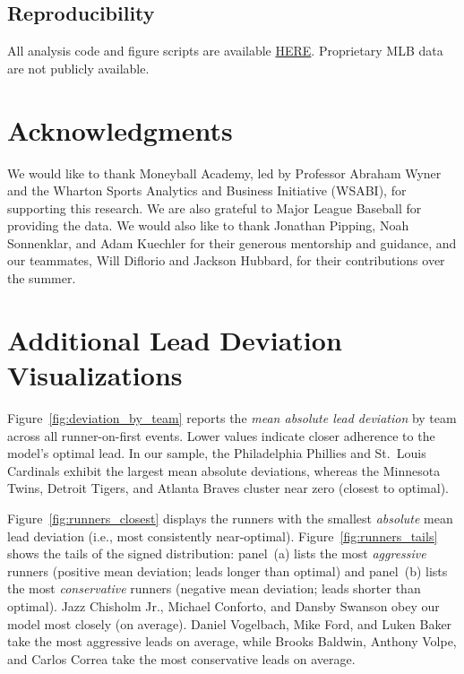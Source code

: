 \documentclass[12pt,letterpaper]{article}
\begin{document}
\subsection{Reproducibility}

All analysis code and figure scripts are available \href{https://github.com/wharton-moneyball/stolen-base-leads}{HERE}. Proprietary MLB data are not publicly available.

\section{Acknowledgments}

We would like to thank Moneyball Academy, led by Professor Abraham Wyner and the Wharton Sports Analytics and Business Initiative (WSABI), for supporting this research. We are also grateful to Major League Baseball for providing the data. We would also like to thank Jonathan Pipping, Noah Sonnenklar, and Adam Kuechler for their generous mentorship and guidance, and our teammates, Will Diflorio and Jackson Hubbard, for their contributions over the summer.




\appendix

\section{Additional Lead Deviation Visualizations} \label{app:a}

Figure~\ref{fig:deviation_by_team} reports the \emph{mean absolute lead deviation} by team across all runner-on-first events. Lower values indicate closer adherence to the model’s optimal lead. In our sample, the Philadelphia Phillies and St.~Louis Cardinals exhibit the largest mean absolute deviations, whereas the Minnesota Twins, Detroit Tigers, and Atlanta Braves cluster near zero (closest to optimal).

Figure~\ref{fig:runners_closest} displays the runners with the smallest \emph{absolute} mean lead deviation (i.e., most consistently near-optimal). Figure~\ref{fig:runners_tails} shows the tails of the signed distribution: panel~(a) lists the most \emph{aggressive} runners (positive mean deviation; leads longer than optimal) and panel~(b) lists the most \emph{conservative} runners (negative mean deviation; leads shorter than optimal). Jazz Chisholm Jr., Michael Conforto, and Dansby Swanson obey our model most closely (on average). Daniel Vogelbach, Mike Ford, and Luken Baker take the most aggressive leads on average, while  Brooks Baldwin, Anthony Volpe, and Carlos Correa take the most conservative leads on average.
\end{document}
